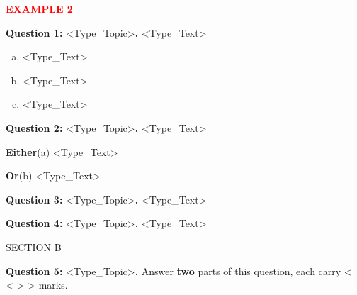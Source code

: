\documentclass[11pt,a4paper,twoside]{article}
\begin{document}
\noindent \textcolor{red}{\textbf{EXAMPLE 2}}

\noindent\textbf{Question 1: }<Type\_Topic>\textbf{. }<Type\_Text>
\begin{flushright}\end{flushright}

\begin{enumerate}[a. ]
\item <Type\_Text> 
\begin{flushright}[< < > > Marks]\end{flushright}
\item <Type\_Text> 
\begin{flushright}[< < > > Marks]\end{flushright}
\item <Type\_Text> 
\begin{flushright}[< < > > Marks]\end{flushright}
\end{enumerate}

\noindent\textbf{Question 2: }<Type\_Topic>\textbf{. }<Type\_Text>
\begin{flushright}\end{flushright}

\textbf{Either}\quad \quad (a) \quad <Type\_Text>
 \begin{flushright}[< < > > Marks]\end{flushright}
 
\textbf{Or}\quad \quad \quad (b) \quad <Type\_Text>
 \begin{flushright}[< < > > Marks]\end{flushright}

\noindent\textbf{Question 3: }<Type\_Topic>\textbf{. }<Type\_Text>
\begin{flushright}\end{flushright}

\noindent\textbf{Question 4: }<Type\_Topic>\textbf{. }<Type\_Text>
\begin{flushright}\end{flushright}

\begin{center}SECTION B\end{center}

\noindent\textbf{Question 5: } <Type\_Topic>\textbf{. }Answer \textbf{two} 
parts of this question, each carry < < > > marks.
\begin{flushright}\end{flushright}
\end{document}
